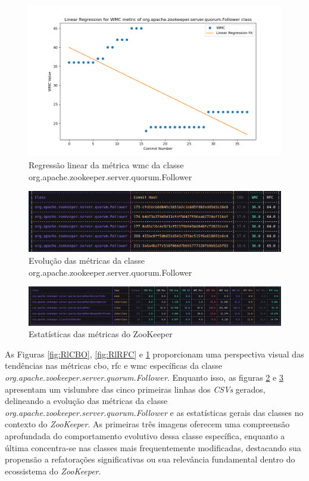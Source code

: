 \begin{figure}[h]
    \centering
    \includegraphics[width=0.8\linewidth]{figuras/Output/Metrics_Predictions/WMC.png}
    \caption{Regressão linear da métrica \gls{wmc} da classe org.apache.zookeeper.server.quorum.Follower}
    \label{fig:RlWMC}
\end{figure}

\begin{figure}[h]
    \centering
    \includegraphics[width=0.8\linewidth]{figuras/Output/Metrics_Evolution/Metrics_Evolution.png}
    \caption{Evolução das métricas da classe org.apache.zookeeper.server.quorum.Follower}
    \label{fig:EvolutionFollowerClass}
\end{figure}

\begin{figure}[h]
    \centering
    \includegraphics[width=0.8\linewidth]{figuras/Output/Metrics_Statistics/Metrics_Statistics.png}
    \caption{Estatísticas das métricas do ZooKeeper}
    \label{fig:StatisticsFollowerClass}
\end{figure}

As Figuras \ref{fig:RlCBO}, \ref{fig:RlRFC} e \ref{fig:RlWMC} proporcionam uma perspectiva visual das tendências nas métricas \gls{cbo}, \gls{rfc} e \gls{wmc} específicas da classe \textit{org.apache.zookeeper.server.quorum.Follower}. Enquanto isso, as figuras \ref{fig:EvolutionFollowerClass} e \ref{fig:StatisticsFollowerClass} apresentam um vislumbre das cinco primeiras linhas dos \textit{CSVs} gerados, delineando a evolução das métricas da classe \textit{org.apache.zookeeper.server.quorum.Follower} e as estatísticas gerais das classes no contexto do \textit{ZooKeeper}. As primeiras três imagens oferecem uma compreensão aprofundada do comportamento evolutivo dessa classe específica, enquanto a última concentra-se nas classes mais frequentemente modificadas, destacando sua propensão a refatorações significativas ou sua relevância fundamental dentro do ecossistema do \textit{ZooKeeper}.

